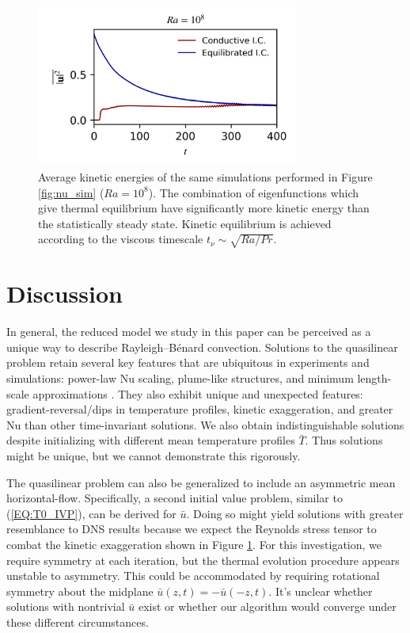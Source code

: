 \documentclass[reprint,amsmath,amssymb,aps]{revtex4-1}
\newcommand\Nu{\mathrm{Nu}}
\begin{document}
\begin{figure}
    \begin{minipage}{3.4in}
        \centering
        \includegraphics[width=3.4in]{sim_eq_ke.png}
        \caption{Average kinetic energies of the same simulations performed in Figure \ref{fig:nu_sim} ($Ra = 10^8$). 
        The combination of eigenfunctions which give thermal equilibrium have significantly more kinetic energy than the statistically steady state. 
        Kinetic equilibrium is achieved according to the viscous timescale $t_{\nu} \sim \sqrt{Ra / Pr}$.}
        \label{fig:ke_sim}
    \end{minipage}
\end{figure}

\section{Discussion}\label{sec:Discussion}
In general, the reduced model we study in this paper can be perceived as a unique way to describe Rayleigh–Bénard convection. 
Solutions to the quasilinear problem retain several key features that are ubiquitous in experiments and simulations: power-law $\Nu$ scaling, plume-like structures, and minimum length-scale approximations \cite{Malkus_1954}. 
They also exhibit unique and unexpected features: gradient-reversal/dips in temperature profiles, kinetic exaggeration, and greater $\Nu$ than other time-invariant solutions. 
We also obtain indistinguishable solutions despite initializing with different mean temperature profiles $\bar{T}$. 
Thus solutions might be unique, but we cannot demonstrate this rigorously.

The quasilinear problem can also be generalized to include an asymmetric mean horizontal-flow. 
Specifically, a second initial value problem, similar to (\ref{EQ:T0_IVP}), can be derived for $\bar{u}$. 
Doing so might yield solutions with greater resemblance to DNS results because we expect the Reynolds stress tensor to combat the kinetic exaggeration shown in Figure \ref{fig:ke_sim}. 
For this investigation, we require symmetry at each iteration, but the thermal evolution procedure appears unstable to asymmetry. 
This could be accommodated by requiring rotational symmetry about the midplane $\bar{u}(z, t) = -\bar{u}(-z, t)$. 
It's unclear whether solutions with nontrivial $\bar{u}$ exist or whether our algorithm would converge under these different circumstances.
\end{document}
